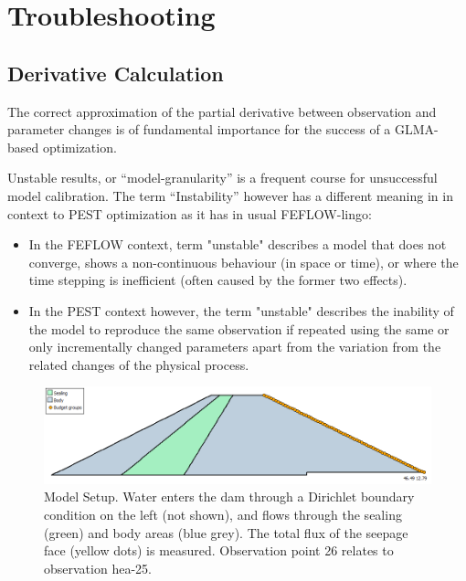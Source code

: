 \chapter{Troubleshooting}

\section{Derivative Calculation}
\label{sec:troubles:derivative}

The correct approximation of the partial derivative between observation and parameter changes is of fundamental importance for the success of a GLMA-based optimization.

Unstable results, or “model-granularity” is a frequent course for unsuccessful model calibration. The term “Instability” however has a different meaning in in context to PEST optimization as it has in usual FEFLOW-lingo:

\begin{itemize}
\item In the FEFLOW context, term "unstable" describes a model that does not converge, shows a non-continuous behaviour (in space or time), or where the time stepping is inefficient (often caused by the former two effects).

\item In the PEST context however, the term "unstable" describes the inability of the model to reproduce the same observation if repeated using the same or only incrementally changed parameters apart from the variation from the related changes of the physical process.
\end{itemize}

\begin{figure}
	\center
	\includegraphics[width=\columnwidth]{figures/model-setup.png}
\caption{Model Setup. Water enters the dam through a Dirichlet boundary condition on the left (not shown), and flows through the sealing (green) and body areas (blue grey). The total flux of the seepage face (yellow dots) is measured. Observation point 26 relates to observation hea-25.}
\label{fig:fepest:model-setup}
\end{figure}

